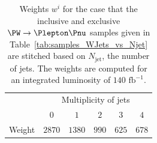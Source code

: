 \documentclass[twocolumn,epjc3]{svjour3}
\newcommand{\jet}{\ensuremath{\textrm{jet}}\xspace}
\newcommand{\fbinv}{\ensuremath{\textrm{~fb}^{-1}}\xspace}
\begin{document}
\begin{table}
\caption{
  Weights $w^{i}$ for the case that the inclusive and exclusive $\PW \to \Plepton\Pnu$ samples 
  given in Table~\ref{tab:samples_WJets_vs_Njet}
  are stitched based on $N_{\jet}$, the number of jets.
  The weights are computed for an integrated luminosity of $140\fbinv$.
}
\label{tab:weights_WJets_vs_Njet}
\begin{tabular}{l|ccccc}
\hline
 & \multicolumn{5}{c}{Multiplicity of jets} \\
 & $0$ & $1$ & $2$ & $3$ & $4$ \\
\hline
\hline
Weight & $2870$ & $1380$ & $990$ & $625$ & $678$ \\
\hline
\end{tabular}
\end{table}

\end{document}

